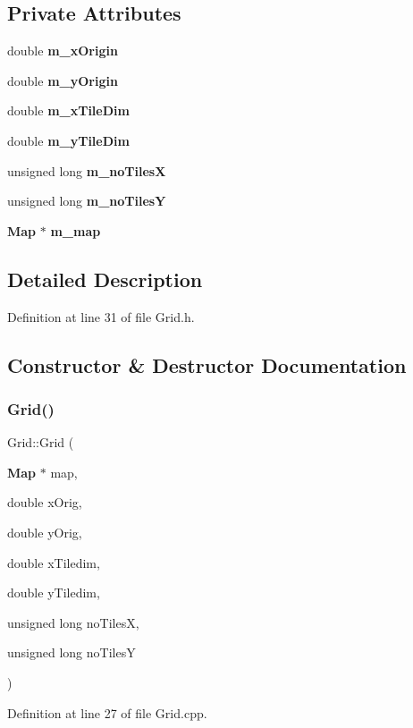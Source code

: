 \subsection*{Private Attributes}
\begin{DoxyCompactItemize}
\item 
double \textbf{ m\+\_\+x\+Origin}
\item 
double \textbf{ m\+\_\+y\+Origin}
\item 
double \textbf{ m\+\_\+x\+Tile\+Dim}
\item 
double \textbf{ m\+\_\+y\+Tile\+Dim}
\item 
unsigned long \textbf{ m\+\_\+no\+TilesX}
\item 
unsigned long \textbf{ m\+\_\+no\+TilesY}
\item 
\textbf{ Map} $\ast$ \textbf{ m\+\_\+map}
\end{DoxyCompactItemize}


\subsection{Detailed Description}


Definition at line 31 of file Grid.\+h.



\subsection{Constructor \& Destructor Documentation}
\mbox{\label{class_grid_a6d2d20a01e2e0d96d19605d1ddb67064}} 
\subsubsection{Grid()}
{\footnotesize\ttfamily Grid\+::\+Grid (\begin{DoxyParamCaption}\item[{\textbf{ Map} $\ast$}]{map,  }\item[{double}]{x\+Orig,  }\item[{double}]{y\+Orig,  }\item[{double}]{x\+Tiledim,  }\item[{double}]{y\+Tiledim,  }\item[{unsigned long}]{no\+TilesX,  }\item[{unsigned long}]{no\+TilesY }\end{DoxyParamCaption})}



Definition at line 27 of file Grid.\+cpp.

